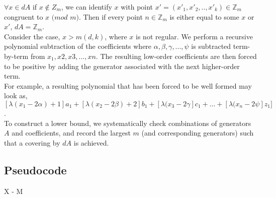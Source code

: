 $\forall x \in dA$ if $x \notin Z_m$, we can identify $x$ with point $x' = (x'_{1}, x'_{2}, .. , x'_{k}) \in \mathbb{Z}_{m}$ congruent to $x$ $(mod$ $m)$.  Then if every point $n \in \mathbb{Z}_{m}$ is either equal to some $x$ or $x'$, $dA = \mathbb{Z}_m$. \\

Consider the case, $x > m(d, k)$, where $x$ is not regular. We perform a recursive polynomial subtraction of the coefficients where $\alpha, \beta, \gamma, ... , \psi$ is subtracted term-by-term from $x_{1}, x{2}, x{3}, ... , x{n}$. The resulting low-order coefficients are then forced to be positive by adding the generator associated with the next higher-order term.\\

For example, a resulting polynomial that has been forced to be well formed may look as, $[\lambda(x_{1} - 2 \alpha) + 1]a_{1} + [\lambda(x_{2} - 2 \beta) + 2]b_{1} + [\lambda(x_{3} - 2 \gamma]c_{1} + ... + [\lambda(x_{n} - 2 \psi]z_{1}]$.\\

To construct a lower bound, we systematically check combinations of generators $A$ and coefficients, and record the largest $m$ (and corresponding generators) such that a covering by $dA$ is achieved.

\subsection{Pseudocode}

\begin{algorithmic}

\State X - M
\EndFor
\end{algorithmic}
